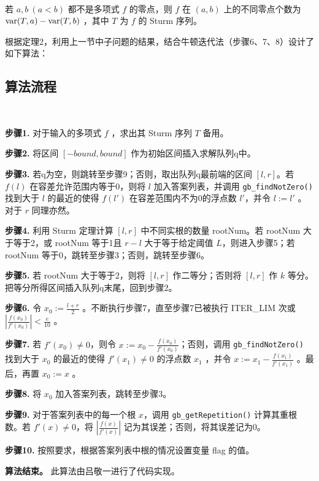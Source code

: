 \begin{theorem}[Sturm 定理]~
	
	若 $a, b \ (a < b)$ 都不是多项式 $f$ 的零点，则 $f$ 在 $(a, b)$ 上的不同零点个数为 $\mathrm{var}(T, a) - \mathrm{var}(T, b)$ ，其中 $T$ 为 $f$ 的 Sturm 序列。 
	
	
\end{theorem}

根据定理2，利用上一节中子问题的结果，结合牛顿迭代法（步骤6、7、8）设计了如下算法：

\subsection{算法流程}

\begin{algorithm}~
	
	\textbf{步骤1.} 对于输入的多项式 $f$ ，求出其 Sturm 序列 $T$ 备用。
	
	\textbf{步骤2.} 将区间 $[-bound, bound]$ 作为初始区间插入求解队列q中。
	
	\textbf{步骤3.} 若q为空，则跳转至步骤9；否则，取出队列q最前端的区间 $[l, r]$。若 $f(l)$ 在容差允许范围内等于0，则将 $l$ 加入答案列表，并调用 \verb|gb_findNotZero()| 找到大于 $l$ 的最近的使得 $f(l')$ 在容差范围内不为0的浮点数 $l'$，并令 $l := l'$ 。对于 $r$ 同理亦然。
	
	\textbf{步骤4.} 利用 Sturm 定理计算 $[l, r]$ 中不同实根的数量 rootNum。若 rootNum 大于等于2，或 rootNum 等于1且 $r - l$ 大于等于给定阈值 $L$，则进入步骤5；若 rootNum 等于0，跳转至步骤3；否则，跳转至步骤6。
	
	\textbf{步骤5.} 若 rootNum 大于等于2，则将 $[l, r]$ 作二等分；否则将 $[l, r]$ 作 $k$ 等分。把等分所得区间插入队列q末尾，回到步骤2。
	
	\textbf{步骤6.} 令 $x_0 := \frac{l + r}{2}$ 。不断执行步骤7，直至步骤7已被执行 ITER\_LIM 次或 $|\frac{f(x_0)}{f'(x_0)}| < \frac{e}{10}$ 。
	
	\textbf{步骤7.} 若 $f'(x_0) \neq 0$，则令 $x := x_0 - \frac{f(x_0)}{f'(x_0)}$；否则，调用 \verb|gb_findNotZero()| 找到大于 $x_0$ 的最近的使得 $f'(x_1) \neq 0$ 的浮点数 $x_1$ ，并令 $x := x_1 - \frac{f(x_1)}{f'(x_1)}$ 。最后，再置 $x_0 := x$ 。
	
	\textbf{步骤8.} 将 $x_0$ 加入答案列表，跳转至步骤3。
	
	\textbf{步骤9.} 对于答案列表中的每一个根 $x$，调用 \verb|gb_getRepetition()| 计算其重根数。若 $f'(x) \neq 0$，将 $|\frac{f(x)}{f'(x)}|$ 记为其误差；否则，将其误差记为0。
	
	\textbf{步骤10.} 按照要求，根据答案列表中根的情况设置变量 flag 的值。
	
	\textbf{算法结束。} 此算法由吕敬一进行了代码实现。
	
	
\end{algorithm}

